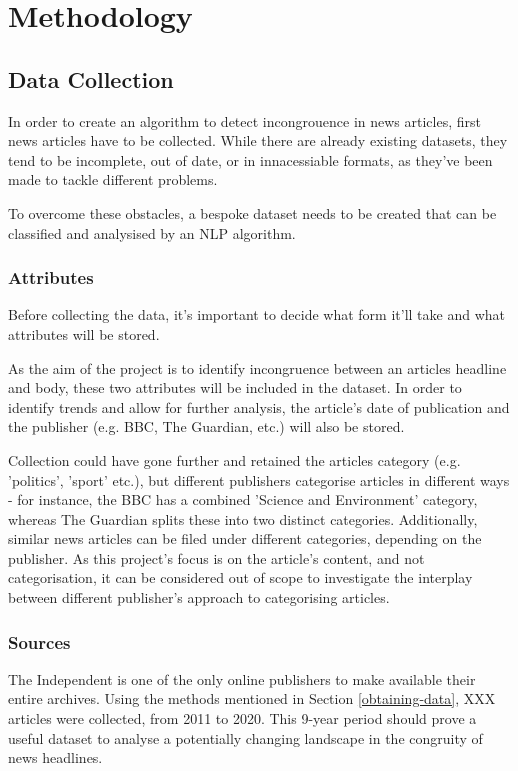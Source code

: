 
\section{Methodology}
\subsection{Data Collection}
In order to create an algorithm to detect incongrouence in news articles, first news articles have to be collected. While there are already existing datasets, they tend to be incomplete, out of date, or in innacessiable formats, as they've been made to tackle different problems.

To overcome these obstacles, a bespoke dataset needs to be created that can be classified and analysised by an NLP algorithm.

\subsubsection{Attributes}
Before collecting the data, it's important to decide what form it'll take and what attributes will be stored.

As the aim of the project is to identify incongruence between an articles headline and body, these two attributes will be included in the dataset. In order to identify trends and allow for further analysis, the article's date of publication and the publisher (e.g. BBC, The Guardian, etc.) will also be stored.

Collection could have gone further and retained the articles category (e.g. 'politics', 'sport' etc.), but different publishers categorise articles in different ways - for instance, the BBC has a combined 'Science and Environment' category, whereas The Guardian splits these into two distinct categories. Additionally, similar news articles can be filed under different categories, depending on the publisher. As this project's focus is on the article's content, and not categorisation, it can be considered out of scope to investigate the interplay between different publisher's approach to categorising articles.

\subsubsection{Sources}
The Independent is one of the only online publishers to make available their entire archives. Using the methods mentioned in Section \ref{obtaining-data}, XXX articles were collected, from 2011 to 2020. This 9-year period should prove a useful dataset to analyse a potentially changing landscape in the congruity of news headlines.

